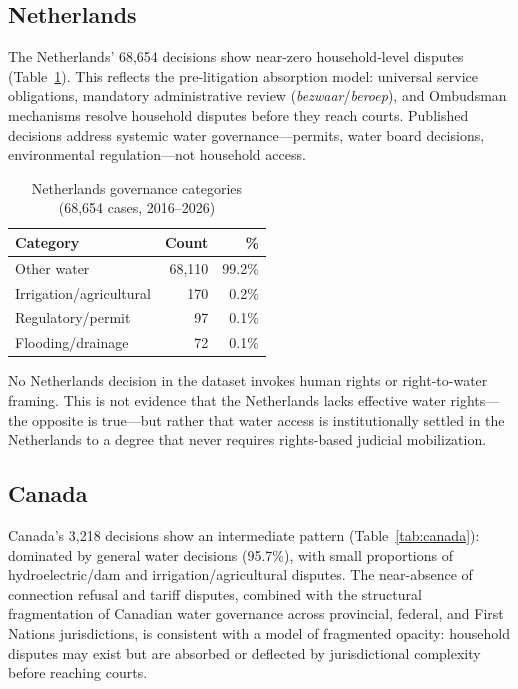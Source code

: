 \documentclass[12pt]{article}
\begin{document}
\subsection{Netherlands}

The Netherlands' 68,654 decisions show near-zero household-level disputes (Table~\ref{tab:nl}). This reflects the pre-litigation absorption model: universal service obligations, mandatory administrative review (\emph{bezwaar}/\emph{beroep}), and Ombudsman mechanisms resolve household disputes before they reach courts. Published decisions address systemic water governance—permits, water board decisions, environmental regulation—not household access.

\begin{table}[h]
\centering
\caption{Netherlands governance categories (68,654 cases, 2016--2026)}
\label{tab:nl}
\begin{tabular}{@{}lrr@{}}
\toprule
Category & Count & \% \\
\midrule
Other water & 68,110 & 99.2\% \\
Irrigation/agricultural & 170 & 0.2\% \\
Regulatory/permit & 97 & 0.1\% \\
Flooding/drainage & 72 & 0.1\% \\
\bottomrule
\end{tabular}
\end{table}

No Netherlands decision in the dataset invokes human rights or right-to-water framing. This is not evidence that the Netherlands lacks effective water rights—the opposite is true—but rather that water access is institutionally settled in the Netherlands to a degree that never requires rights-based judicial mobilization.

\subsection{Canada}

Canada's 3,218 decisions show an intermediate pattern (Table~\ref{tab:canada}): dominated by general water decisions (95.7\%), with small proportions of hydroelectric/dam and irrigation/agricultural disputes. The near-absence of connection refusal and tariff disputes, combined with the structural fragmentation of Canadian water governance across provincial, federal, and First Nations jurisdictions, is consistent with a model of fragmented opacity: household disputes may exist but are absorbed or deflected by jurisdictional complexity before reaching courts.
\end{document}
